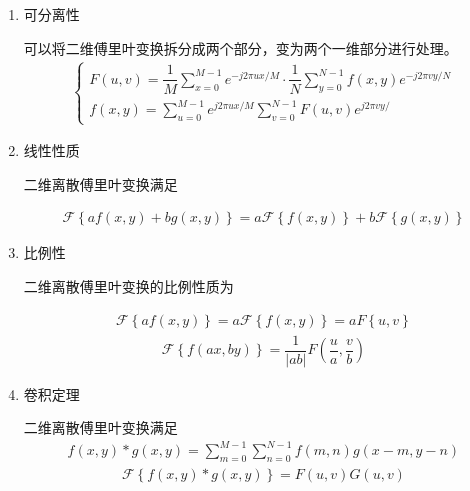 \documentclass{hitreport}
\begin{document}
\begin{enumerate}
\item 可分离性

可以将二维傅里叶变换拆分成两个部分，变为两个一维部分进行处理。
\begin{align}
\left\{
\begin{array}{l}
F\left(u,v\right) = \dfrac{1}{M}\sum\limits_{x=0}^{M-1}{e^{\left. -j2\pi ux / M\right.}}\cdot \dfrac{1}{N}\sum\limits_{y=0}^{N-1}{f\left(x,y\right)e^{\left. -j2\pi vy / N\right.}}\\
f\left(x,y\right) = \sum\limits_{u=0}^{M-1}{e^{\left. j2\pi ux / M \right.}}\sum\limits_{v=0}^{N-1}{F\left(u,v\right) e^{\left. j2\pi vy / \right.}}	
\end{array}
\right.
\end{align}

\item 线性性质

二维离散傅里叶变换满足

\begin{align}
\mathscr{F}\left\{af\left(x,y\right)+bg\left(x,y\right)\right\} = a\mathscr{F}\left\{f\left(x,y\right)\right\}+b\mathscr{F}\left\{g\left(x,y\right)\right\}
\end{align}

\item 比例性

二维离散傅里叶变换的比例性质为

\begin{align}
\mathscr{F}\left\{af\left(x,y\right)\right\} = a\mathscr{F}\left\{f\left(x,y\right)\right\} = aF\left\{u,v\right\}
\end{align}
\begin{align}
\mathscr{F}\left\{f\left(ax,by\right)\right\} = \dfrac{1}{\lvert ab \rvert}F\left(\dfrac{u}{a},\dfrac{v}{b}\right)
\end{align}

\item 卷积定理

二维离散傅里叶变换满足
\begin{align}
f\left(x,y\right)\ast g\left(x,y\right) = \sum\limits_{m=0}^{M-1}\sum\limits_{n=0}^{N-1}{f\left(m,n\right)g\left(x-m,y-n\right)}
\end{align}
\begin{align}
\mathscr{F}\left\{f\left(x,y\right)\ast g\left(x,y\right)\right\} = F\left(u,v\right)G\left(u,v\right)
\end{align}

\end{enumerate}
\end{document}
